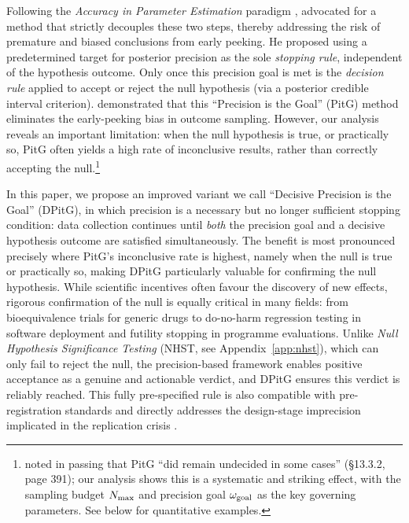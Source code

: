 Following the \textit{Accuracy in Parameter Estimation} paradigm \citep{maxwell2008},
\cite{kruschke2015doing} advocated for a method that strictly decouples these two steps,
thereby addressing the risk of premature and biased conclusions from early peeking.
He proposed using a predetermined target for posterior precision as the
sole \textit{stopping rule}, independent of the hypothesis outcome. Only once this precision goal
is met is the \textit{decision rule} applied to accept or reject the null hypothesis
(via a posterior credible interval criterion).
\cite{kruschke2015doing} demonstrated that this ``Precision is the Goal'' (PitG) method
eliminates the early-peeking bias in outcome sampling. However, our analysis reveals an important
limitation: when the null hypothesis is true, or practically so, PitG often yields a high rate of inconclusive
results, rather than correctly accepting the null.\footnote{\citealt{kruschke2015doing} noted in passing that PitG ``did remain undecided
in some cases'' (\S13.3.2, page 391); our analysis shows this is a systematic and
striking effect, with the sampling budget $N_{\rm max}$ and precision goal $\omega_{\rm goal}$
as the key governing parameters. See below for quantitative examples.}

In this paper, we propose an improved variant we call
``Decisive Precision is the Goal'' (DPitG), in which precision is a necessary but no
longer sufficient stopping condition: data collection continues until \textit{both} the
precision goal and a decisive hypothesis outcome are satisfied simultaneously.
The benefit is most pronounced precisely where PitG's inconclusive rate is highest,
namely when the null is true or practically so, making DPitG particularly valuable for
confirming the null hypothesis.
While scientific incentives often favour the discovery of new effects,
rigorous confirmation of the null is equally critical in many fields: from bioequivalence
trials for generic drugs \citep{schuirmann1987, karalis2012}
to do-no-harm regression testing in software
deployment and futility stopping in programme evaluations.
Unlike \textit{Null Hypothesis Significance Testing} (NHST, see Appendix~\ref{app:nhst}),
which can only fail to reject the null, the precision-based framework enables positive
acceptance as a genuine and actionable verdict, and DPitG ensures this verdict is
reliably reached.
This fully pre-specified rule is also compatible with pre-registration standards
\citep{nosek2018} and directly addresses the design-stage imprecision implicated in
the replication crisis \citep{osc2015, gelman2014}.

